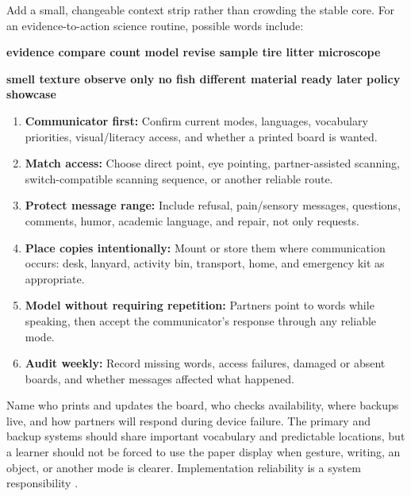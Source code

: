 Add a small, changeable context strip rather than crowding the stable core. For an evidence-to-action science routine, possible words include:

\begin{center}
\colorbox{SoftGray}{\parbox{0.94\textwidth}{\centering\small
\textbf{evidence \quad compare \quad count \quad model \quad revise \quad sample \quad tire \quad litter \quad microscope}\par\vspace{0.03in}
\textbf{smell \quad texture \quad observe only \quad no fish \quad different material \quad ready later \quad policy \quad showcase}
}}
\end{center}


\begin{enumerate}
  \item \textbf{Communicator first:} Confirm current modes, languages, vocabulary priorities, visual/literacy access, and whether a printed board is wanted.
  \item \textbf{Match access:} Choose direct point, eye pointing, partner-assisted scanning, switch-compatible scanning sequence, or another reliable route.
  \item \textbf{Protect message range:} Include refusal, pain/sensory messages, questions, comments, humor, academic language, and repair, not only requests.
  \item \textbf{Place copies intentionally:} Mount or store them where communication occurs: desk, lanyard, activity bin, transport, home, and emergency kit as appropriate.
  \item \textbf{Model without requiring repetition:} Partners point to words while speaking, then accept the communicator's response through any reliable mode.
  \item \textbf{Audit weekly:} Record missing words, access failures, damaged or absent boards, and whether messages affected what happened.
\end{enumerate}


Name who prints and updates the board, who checks availability, where backups live, and how partners will respond during device failure. The primary and backup systems should share important vocabulary and predictable locations, but a learner should not be forced to use the paper display when gesture, writing, an object, or another mode is clearer. Implementation reliability is a system responsibility \citep{norrie2021context}.

